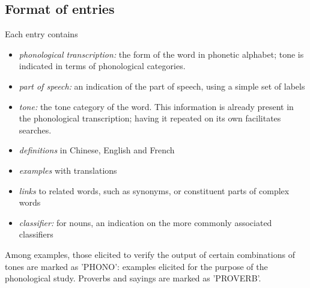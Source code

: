 	\subsection{Format of entries} \label{sec:entries}

Each entry contains
\begin{itemize}
	\item \textit{phonological transcription:} the form of the word in phonetic alphabet; tone is indicated in terms of phonological categories. 
	\item \textit{part of speech:} an indication of the part of speech, using a simple set of labels
	\item \textit{tone:} the tone category of the word. This information is already present in the phonological transcription; having it repeated on its own facilitates searches.
	\item \textit{definitions} in Chinese, English and French
	\item \textit{examples} with translations
	\item \textit{links} to related words, such as synonyms, or constituent parts of complex words 
	\item \textit{classifier:} for nouns, an indication on the more commonly associated classifiers
\end{itemize}

Among examples, those elicited to verify the output of certain combinations of tones are marked as 'PHONO': examples elicited for the purpose of the phonological study. Proverbs and sayings are marked as 'PROVERB'.

